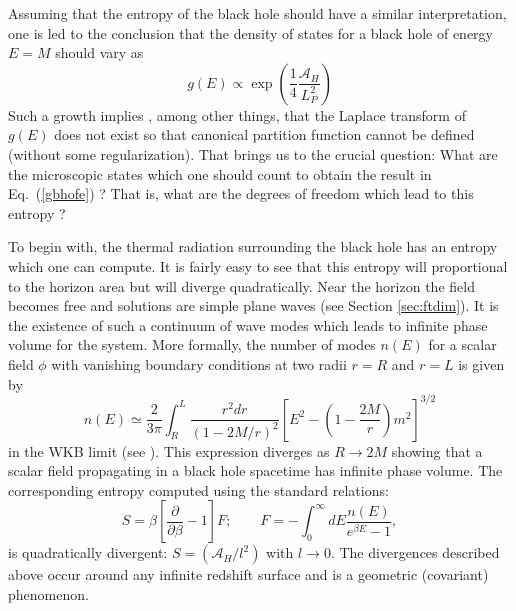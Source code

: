 \documentclass[12pt]{iopart}
\begin{document}
Assuming that the entropy of the black hole should have a similar interpretation, one is 
led to the conclusion that the density of states for a black hole of energy $E = M$ should vary as
   \begin{equation}
   g(E) \propto \exp \left(\frac{1}{4}\frac{\mathcal{A}_H}{L_P^2}\right)
   \label{gbhofe}
   \end{equation}
  Such a growth implies \cite{TPgravcqg04}, among other things, that the Laplace transform of $g(E)$ 
  does not exist so that  canonical partition function cannot be defined
  (without some regularization). 
  That brings us to the crucial question: What are the microscopic states  which
 one should count to obtain the result in Eq.~(\ref{gbhofe}) ? That is, what are the degrees of freedom
   which lead to this entropy ? 
   
 
 To begin with, the thermal radiation surrounding the black hole has an entropy 
   which one can  compute. It is fairly easy to see that this entropy will 
   proportional to the horizon area but will
   diverge quadratically.
   Near the horizon  the field becomes free 
and solutions are simple plane waves (see Section \ref{sec:ftdim}). It is the  existence of such a continuum
of wave modes which leads to infinite phase volume for the system.
More formally, the number of modes  $n(E)$ for a scalar field $\phi$ with vanishing
boundary conditions at two radii $r=R$ and $r=L$ is given by
\begin{equation}  
n(E) 
 \simeq \frac{2}{ 3\pi} \int^L_R \frac{r^2 dr}{ \left( 1 - 2M/r\right)^2}\left[ E^2 - 
 \left( 1 -\frac{2M}{ r}\right)  m^2\right]^{3/2} \label{eqn:qnofe}
\end{equation}
in the WKB limit (see
\cite{'tHooft:1985re,Padmanabhan:1986rs}). This expression diverges as $R\to 2M$ showing that
a scalar field propagating  in a black hole spacetime has infinite phase volume. The corresponding entropy
computed using the standard relations:
\begin{equation} 
S = \beta \left[ \frac{\partial}{ \partial \beta} - 1 \right] F; \qquad
F = - \int_0^\infty dE \frac{n(E)}{e^{\beta E} - 1 },
\end{equation}
is quadratically divergent:  $S = (\mathcal{A}_H/l^2)$ with $l \to 0$. 
The divergences described above occur around any infinite
redshift surface and is a geometric (covariant) phenomenon. 
  
\end{document}
